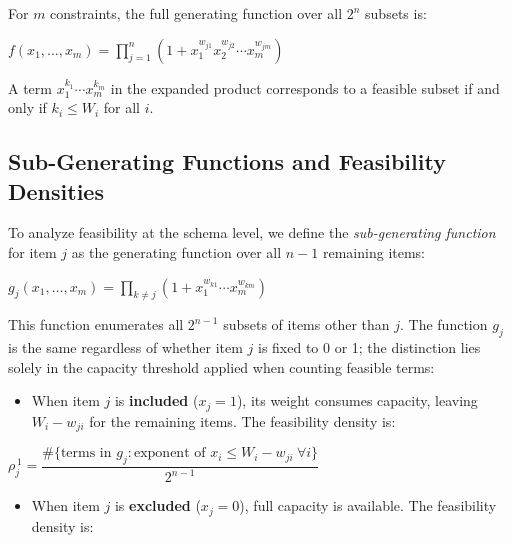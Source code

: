 \documentclass[twocolumn]{article}
\begin{document}
For $m$ constraints, the full generating function over all $2^n$ subsets is:

\begin{flushleft}
\hspace{2em}$f(x_1, \ldots, x_m) = \prod_{j=1}^{n} 
\left(1 + x_1^{w_{j1}} x_2^{w_{j2}} \cdots x_m^{w_{jm}}\right)$
\end{flushleft}

A term $x_1^{k_1} \cdots x_m^{k_m}$ in the expanded product corresponds 
to a feasible subset if and only if $k_i \leq W_i$ for all $i$.

\subsection{Sub-Generating Functions and Feasibility Densities}

To analyze feasibility at the schema level, we define the 
\textit{sub-generating function} for item $j$ as the generating function 
over all $n-1$ remaining items:

\begin{flushleft}
\hspace{2em}$g_j(x_1, \ldots, x_m) = \prod_{k \neq j} 
\left(1 + x_1^{w_{k1}} \cdots x_m^{w_{km}}\right)$
\end{flushleft}

This function enumerates all $2^{n-1}$ subsets of items other than $j$. 
The function $g_j$ is the same regardless of whether item $j$ is fixed 
to 0 or 1; the distinction lies solely in the capacity threshold applied 
when counting feasible terms:

\begin{itemize}
    \item When item $j$ is \textbf{included} ($x_j = 1$), its weight 
    consumes capacity, leaving $W_i - w_{ji}$ for the remaining items. 
    The feasibility density is:
\end{itemize}

\begin{flushleft}
\hspace{2em}$\rho_{j}^{\,1} = \dfrac{\#\bigl\{\text{terms in } 
g_j : \text{exponent of } 
x_i \leq W_i - w_{ji} \ \forall i\bigr\}}{2^{n-1}}$
\end{flushleft}

\begin{itemize}
    \item When item $j$ is \textbf{excluded} ($x_j = 0$), full capacity 
    is available. The feasibility density is:
\end{itemize}
\end{document}
